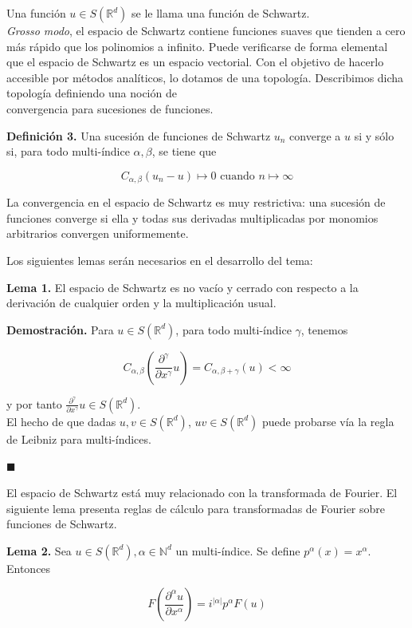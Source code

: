 \begin{itemize}
Una función $u \in S(\mathbb{R}^d)$ se le llama una función de Schwartz.\\

\textit{Grosso modo}, el espacio de Schwartz contiene funciones suaves que tienden a cero más rápido que los polinomios a infinito. Puede verificarse de forma elemental que el espacio de Schwartz es un espacio vectorial. Con el objetivo de hacerlo accesible por métodos analíticos, lo dotamos de una topología. Describimos dicha topología definiendo una noción de \\convergencia para sucesiones de funciones.

\textbf{Definición 3.} Una sucesión de funciones de Schwartz ${u_n}$ converge a $u$ si y sólo si, para todo multi-índice $\alpha, \beta$, se tiene que 

$$C_{\alpha,\beta}(u_n - u) \mapsto 0 \text{    cuando } n \mapsto \infty$$

La convergencia en el espacio de Schwartz es muy restrictiva: una sucesión de funciones converge si ella y todas sus derivadas multiplicadas por monomios arbitrarios convergen uniformemente. 

Los siguientes lemas serán necesarios en el desarrollo del tema:

\textbf{Lema 1.} El espacio de Schwartz es no vacío y cerrado con respecto a la derivación de cualquier orden y la multiplicación usual.

\textbf{Demostración.} Para $u \in S(\mathbb{R}^d)$, para todo multi-índice $\gamma$, tenemos 

$$C_{\alpha,\beta}(\frac{\partial^\gamma}{\partial x^\gamma}u) = C_{\alpha,\beta+\gamma}(u) < \infty$$

y por tanto $\frac{\partial^\gamma}{\partial x^\gamma}u \in S(\mathbb{R}^d)$. \\

El hecho de que dadas $u, v \in S(\mathbb{R}^d)$, $uv \in S(\mathbb{R}^d)$ puede probarse vía la regla de Leibniz para multi-índices.

\hfill$\blacksquare$

El espacio de Schwartz está muy relacionado con la transformada de Fourier. El siguiente lema presenta reglas de cálculo para transformadas de Fourier sobre funciones de Schwartz.

\textbf{Lema 2.} Sea $u \in S(\mathbb{R}^d), \alpha \in \mathbb{N}^d$ un multi-índice. Se define $p^\alpha(x) = x^\alpha$. Entonces

$$F(\frac{\partial^\alpha u}{\partial x^\alpha}) = i^{|\alpha|}p^\alpha F(u)$$


\end{itemize}
